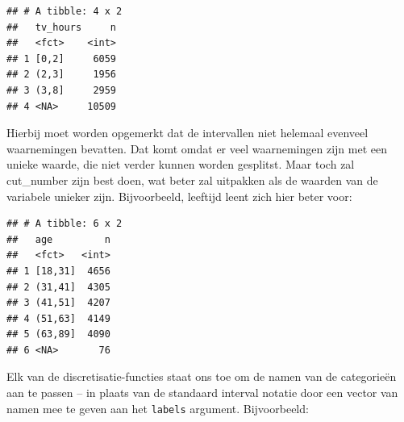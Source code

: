 \documentclass[]{tufte-book}
\newenvironment{Shaded}{}{}
\newcommand{\DataTypeTok}[1]{\textcolor[rgb]{0.56,0.13,0.00}{#1}}
\newcommand{\DecValTok}[1]{\textcolor[rgb]{0.25,0.63,0.44}{#1}}
\newcommand{\KeywordTok}[1]{\textcolor[rgb]{0.00,0.44,0.13}{\textbf{#1}}}
\newcommand{\NormalTok}[1]{#1}
\newcommand{\OperatorTok}[1]{\textcolor[rgb]{0.40,0.40,0.40}{#1}}
\newcommand{\StringTok}[1]{\textcolor[rgb]{0.25,0.44,0.63}{#1}}
\begin{document}
\begin{verbatim}
## # A tibble: 4 x 2
##   tv_hours     n
##   <fct>    <int>
## 1 [0,2]     6059
## 2 (2,3]     1956
## 3 (3,8]     2959
## 4 <NA>     10509
\end{verbatim}

Hierbij moet worden opgemerkt dat de intervallen niet helemaal evenveel waarnemingen bevatten. Dat komt omdat er veel waarnemingen zijn met een unieke waarde, die niet verder kunnen worden gesplitst. Maar toch zal cut\_number zijn best doen, wat beter zal uitpakken als de waarden van de variabele unieker zijn. Bijvoorbeeld, leeftijd leent zich hier beter voor:

\begin{Shaded}
\end{Shaded}

\begin{verbatim}
## # A tibble: 6 x 2
##   age         n
##   <fct>   <int>
## 1 [18,31]  4656
## 2 (31,41]  4305
## 3 (41,51]  4207
## 4 (51,63]  4149
## 5 (63,89]  4090
## 6 <NA>       76
\end{verbatim}

Elk van de discretisatie-functies staat ons toe om de namen van de categorieën aan te passen -- in plaats van de standaard interval notatie door een vector van namen mee te geven aan het \texttt{labels} argument. Bijvoorbeeld:

\begin{Shaded}
\end{Shaded}
\end{document}
